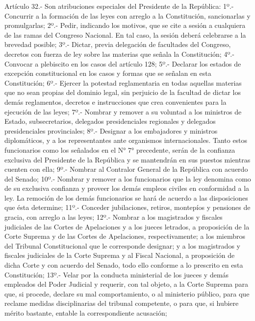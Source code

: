     Artículo 32.- Son atribuciones especiales del Presidente de la República:
    1º.- Concurrir a la formación de las leyes con arreglo a la Constitución, sancionarlas y promulgarlas;
    2º.- Pedir, indicando los motivos, que se cite a sesión a cualquiera de las ramas del Congreso Nacional. En tal caso, la sesión deberá celebrarse a la brevedad posible;
    3º.- Dictar, previa delegación de facultades del Congreso, decretos con fuerza de ley sobre las materias que señala la Constitución;
    4º.- Convocar a plebiscito en los casos del artículo 128;
    5º.- Declarar los estados de excepción constitucional en los casos y formas que se señalan en esta Constitución;
    6º.- Ejercer la potestad reglamentaria en todas aquellas materias que no sean propias del dominio legal, sin perjuicio de la facultad de dictar los demás reglamentos, decretos e instrucciones que crea convenientes para la ejecución de las leyes;
    7º.- Nombrar y remover a su voluntad a los ministros de Estado, subsecretarios, delegados presidenciales regionales y delegados presidenciales provinciales;
    8º.- Designar a los embajadores y ministros diplomáticos, y a los representantes ante organismos internacionales. Tanto estos funcionarios como los señalados en el N° 7° precedente, serán de la confianza exclusiva del Presidente de la República y se mantendrán en sus puestos mientras cuenten con ella;
    9º.- Nombrar al Contralor General de la República con acuerdo del Senado;
    10º.- Nombrar y remover a los funcionarios que la ley denomina como de su exclusiva confianza y proveer los demás empleos civiles en conformidad a la ley. La remoción de los demás funcionarios se hará de acuerdo a las disposiciones que ésta determine;
    11º.- Conceder jubilaciones, retiros, montepíos y pensiones de gracia, con arreglo a las leyes;
    12º.- Nombrar a los magistrados y fiscales judiciales de las Cortes de Apelaciones y a los jueces letrados, a proposición de la Corte Suprema y de las Cortes de Apelaciones, respectivamente; a los miembros del Tribunal Constitucional que le corresponde designar; y a los magistrados y fiscales judiciales de la Corte Suprema y al Fiscal Nacional, a proposición de dicha Corte y con acuerdo del Senado, todo ello conforme a lo prescrito en esta Constitución;
    13º.- Velar por la conducta ministerial de los jueces y demás empleados del Poder Judicial y requerir, con tal objeto, a la Corte Suprema para que, si procede, declare su mal comportamiento, o al ministerio público, para que reclame medidas disciplinarias del tribunal competente, o para que, si hubiere mérito bastante, entable la correspondiente acusación; 
